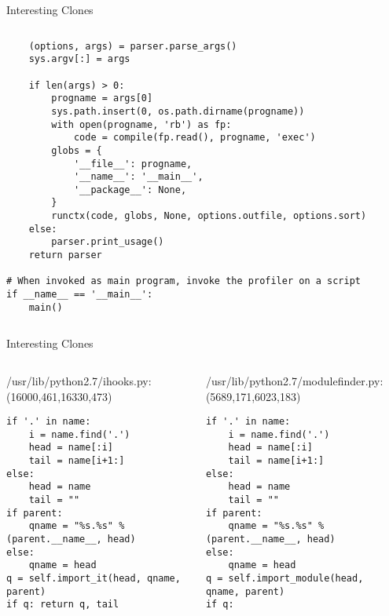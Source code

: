 \begin{frame}[shrink=35,fragile]{Interesting Clones}
\begin{columns}
\begin{column}[t]{0.48\textwidth}
\begin{lstlisting}
    (options, args) = parser.parse_args()
    sys.argv[:] = args

    if len(args) > 0:
        progname = args[0]
        sys.path.insert(0, os.path.dirname(progname))
        with open(progname, 'rb') as fp:
            code = compile(fp.read(), progname, 'exec')
        globs = {
            '__file__': progname,
            '__name__': '__main__',
            '__package__': None,
        }
        runctx(code, globs, None, options.outfile, options.sort)
    else:
        parser.print_usage()
    return parser

# When invoked as main program, invoke the profiler on a script
if __name__ == '__main__':
    main()
\end{lstlisting}

\end{column}
\end{columns}

\end{frame}


\begin{frame}[shrink=20,fragile]{Interesting Clones}

\lstset{
    breaklines=true,
    language=Python
}

\begin{columns}
\begin{column}[t]{0.48\textwidth}
/usr/lib/python2.7/ihooks.py:(16000,461,16330,473)
\begin{lstlisting}
if '.' in name:
    i = name.find('.')
    head = name[:i]
    tail = name[i+1:]
else:
    head = name
    tail = ""
if parent:
    qname = "%s.%s" % (parent.__name__, head)
else:
    qname = head
q = self.import_it(head, qname, parent)
if q: return q, tail
\end{lstlisting}
\end{column}

\begin{column}[t]{0.48\textwidth}
/usr/lib/python2.7/modulefinder.py:(5689,171,6023,183)
\begin{lstlisting}
if '.' in name:
    i = name.find('.')
    head = name[:i]
    tail = name[i+1:]
else:
    head = name
    tail = ""
if parent:
    qname = "%s.%s" % (parent.__name__, head)
else:
    qname = head
q = self.import_module(head, qname, parent)
if q:
\end{lstlisting}

\end{column}
\end{columns}

\end{frame}


